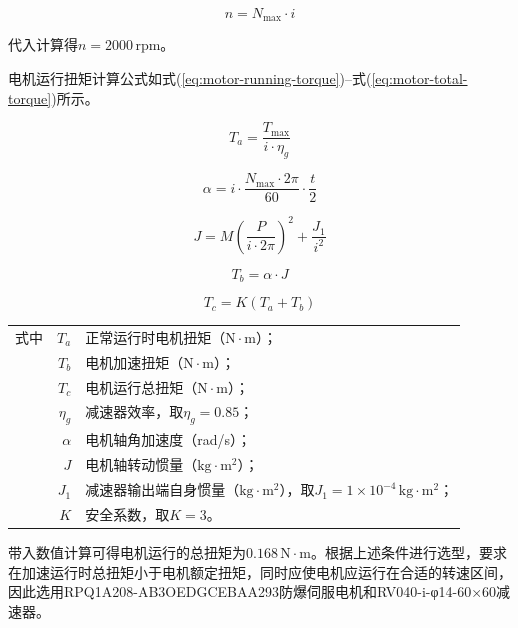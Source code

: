 \begin{equation}\label{eq:motor-speed}
n=N_{\max}\cdot i
\end{equation}

代入计算得$n=2000\,\mathrm{rpm}$。

电机运行扭矩计算公式如式(\ref{eq:motor-running-torque})--式(\ref{eq:motor-total-torque})所示。

\begin{equation}\label{eq:motor-running-torque}
T_a=\frac{T_{\max}}{i\cdot\eta_g}
\end{equation}

\begin{equation}\label{eq:motor-angular-acceleration}
\alpha=i\cdot\frac{N_{\max}\cdot2\pi}{60}\cdot\frac{t}{2}
\end{equation}

\begin{equation}\label{eq:motor-inertia}
J=M\left(\frac{P}{i\cdot2\pi}\right)^2+\frac{J_1}{i^2}
\end{equation}

\begin{equation}\label{eq:motor-acceleration-torque}
T_b=\alpha\cdot J
\end{equation}

\begin{equation}\label{eq:motor-total-torque}
T_c=K\left(T_a+T_b\right)
\end{equation}

\noindent\begin{tabularx}{\textwidth}{@{}l@{\quad}r@{———}X@{}}
式中& $T_a$ &正常运行时电机扭矩（$\mathrm{N\cdot m}$）；\\
& $T_b$ &电机加速扭矩（$\mathrm{N\cdot m}$）；\\
& $T_c$ &电机运行总扭矩（$\mathrm{N\cdot m}$）；\\
& $\eta_g$ &减速器效率，取$\eta_g=0.85$；\\
& $\alpha$ &电机轴角加速度（rad/s）；\\
& $J$ &电机轴转动惯量（$\mathrm{kg\cdot m^2}$）；\\
& $J_1$ &减速器输出端自身惯量（$\mathrm{kg\cdot m^2}$），取$J_1=1\times10^{-4}\,\mathrm{kg\cdot m^2}$；\\
& $K$ &安全系数，取$K=3$。
\end{tabularx}\vspace{3.15bp}

带入数值计算可得电机运行的总扭矩为$0.168\,\mathrm{N\cdot m}$。根据上述条件进行选型，要求在加速运行时总扭矩小于电机额定扭矩，同时应使电机应运行在合适的转速区间，因此选用RPQ1A208-AB3OEDGCEBAA293防爆伺服电机和RV040-i-φ14-60×60减速器。

